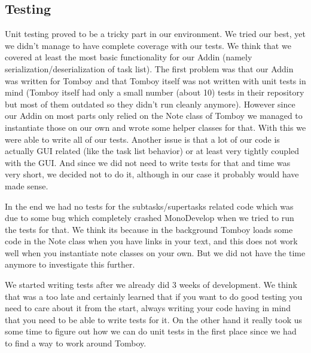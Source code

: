 \subsection{Testing}
\label{testing}
Unit testing proved to be a tricky part in our environment. We tried our best, yet we didn't manage to have complete coverage with our tests. We think that we covered at least the most basic functionality for our Addin (namely serialization/deserialization of task list).
The first problem was that our Addin was written for Tomboy and that Tomboy itself was not written with unit tests in mind (Tomboy itself had only a small number (about 10) tests in their repository but most of them outdated so they didn't run cleanly anymore). However since our Addin on most parts only relied on the Note class of Tomboy we managed to instantiate those on our own and wrote some helper classes for that. With this we were able to write all of our tests.
Another issue is that a lot of our code is actually GUI related (like the task list behavior) or at least very tightly coupled with the GUI. And since we did not need to write tests for that and time was very short, we decided not to do it, although in our case it probably would have made sense.

In the end we had no tests for the subtasks/supertasks related code which was due to some bug which completely crashed MonoDevelop when we tried to run the tests for that. We think its because in the background Tomboy loads some code in the Note class when you have links in your text, and this does not work well when you instantiate note classes on your own. But we did not have the time anymore to investigate this further.

We started writing tests after we already did 3 weeks of development. We think that was a too late and certainly learned that if you want to do good testing you need to care about it from the start, always writing your code having in mind that you need to be able to write tests for it. On the other hand it really took us some time to figure out how we can do unit tests in the first place since we had to find a way to work around Tomboy.